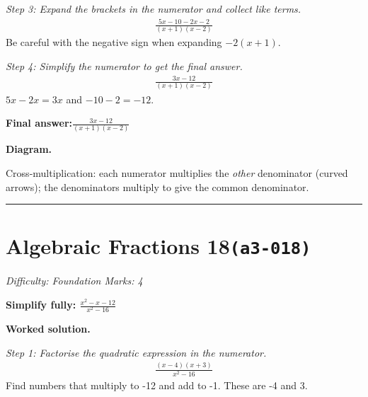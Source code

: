 \documentclass[11pt]{article}
\newcommand{\question}[1]{\par\medskip\noindent\textbf{#1}\par}
\begin{document}
\textit{Step 3: Expand the brackets in the numerator and collect like terms.}
\[\begin{gathered}
\frac{5x - 10 - 2x - 2}{(x+1)(x-2)}
\end{gathered}\]
Be careful with the negative sign when expanding \( -2(x+1) \).

\textit{Step 4: Simplify the numerator to get the final answer.}
\[\begin{gathered}
\frac{3x - 12}{(x+1)(x-2)}
\end{gathered}\]
\( 5x - 2x = 3x \) and \( -10 - 2 = -12 \).

\begin{answerbox}
\textbf{Final answer:}\quad \(\displaystyle \frac{3x - 12}{(x+1)(x-2)}\)
\end{answerbox}
\textbf{Diagram.}

\begin{center}
\end{center}
\small Cross-multiplication: each numerator multiplies the \emph{other} denominator (curved arrows); the denominators multiply to give the common denominator.\normalsize

\medskip\hrule

\section*{Algebraic Fractions 18\quad\small\texttt{(a3-018)}}
\textit{Difficulty: Foundation \quad\textbar\quad Marks: 4}

\question{Simplify fully: \( \frac{x^2 - x - 12}{x^2 - 16} \)}

\textbf{Worked solution.}

\textit{Step 1: Factorise the quadratic expression in the numerator.}
\[\begin{gathered}
\frac{(x - 4)(x + 3)}{x^2 - 16}
\end{gathered}\]
Find numbers that multiply to -12 and add to -1. These are -4 and 3.
\end{document}
